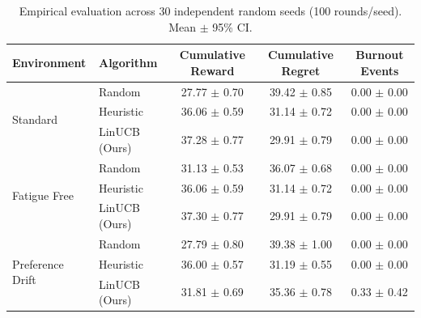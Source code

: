 \begin{table}[t]
\centering
\caption{Empirical evaluation across 30 independent random seeds (100 rounds/seed). Mean $\pm$ 95\% CI.}
\label{tab:evaluation_results}
\begin{tabular}{llccc}
\hline
\textbf{Environment} & \textbf{Algorithm} & \textbf{Cumulative Reward} & \textbf{Cumulative Regret} & \textbf{Burnout Events} \\
\hline
\multirow{3}{*}{Standard} & Random & 27.77 $\pm$ 0.70 & 39.42 $\pm$ 0.85 & 0.00 $\pm$ 0.00 \\
 & Heuristic & 36.06 $\pm$ 0.59 & 31.14 $\pm$ 0.72 & 0.00 $\pm$ 0.00 \\
 & LinUCB (Ours) & 37.28 $\pm$ 0.77 & 29.91 $\pm$ 0.79 & 0.00 $\pm$ 0.00 \\
\hline
\multirow{3}{*}{Fatigue Free} & Random & 31.13 $\pm$ 0.53 & 36.07 $\pm$ 0.68 & 0.00 $\pm$ 0.00 \\
 & Heuristic & 36.06 $\pm$ 0.59 & 31.14 $\pm$ 0.72 & 0.00 $\pm$ 0.00 \\
 & LinUCB (Ours) & 37.30 $\pm$ 0.77 & 29.91 $\pm$ 0.79 & 0.00 $\pm$ 0.00 \\
\hline
\multirow{3}{*}{Preference Drift} & Random & 27.79 $\pm$ 0.80 & 39.38 $\pm$ 1.00 & 0.00 $\pm$ 0.00 \\
 & Heuristic & 36.00 $\pm$ 0.57 & 31.19 $\pm$ 0.55 & 0.00 $\pm$ 0.00 \\
 & LinUCB (Ours) & 31.81 $\pm$ 0.69 & 35.36 $\pm$ 0.78 & 0.33 $\pm$ 0.42 \\
\hline
\end{tabular}
\end{table}